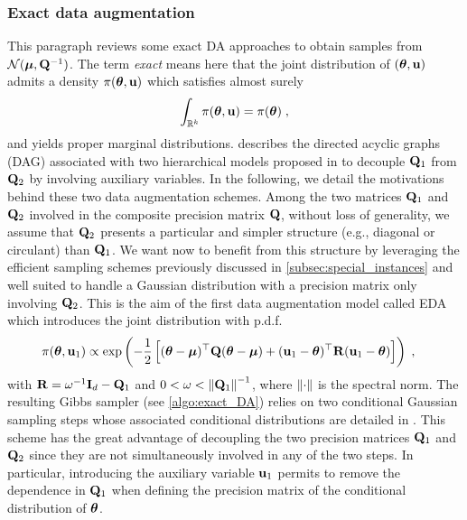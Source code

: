 \documentclass[nohypdvips,onefignum,onetabnum]{siamart171218}
\begin{document}
\subsubsection{Exact data augmentation} \label{subsec:data_aug_exact}
This paragraph reviews some exact DA approaches to obtain samples from $\mathcal{N}(\boldsymbol{\mu},\mathbf{Q}^{-1})$.
The term \textit{exact} means here that the joint distribution of $(\boldsymbol{\theta},\mathbf{u})$ admits a density $\pi(\boldsymbol{\theta},\mathbf{u})$ which satisfies almost surely
\begin{equation}
  \label{eq:exact_DA}
  \int_{\mathbb{R}^k} \pi(\Bs{\theta},\B{u}) = \pi(\Bs{\theta})\eqsp,
\end{equation}
and yields proper marginal distributions. 
 describes the directed acyclic graphs (DAG) associated with two hierarchical models proposed in \cite{Marnissi2018,Marnissi2019} to decouple $\mathbf{Q}_1$ from $\mathbf{Q}_2$ by involving auxiliary variables.  
In the following, we detail the motivations behind these two data augmentation schemes.
Among the two matrices $\mathbf{Q}_1$ and $\mathbf{Q}_2$ involved in the composite precision matrix $\mathbf{Q}$, without loss of generality, we assume that $\mathbf{Q}_2$ presents a particular and simpler structure (e.g., diagonal or circulant) than $\mathbf{Q}_1$. We want now to benefit from this structure by leveraging the efficient sampling schemes previously discussed in \cref{subsec:special_instances} and well suited to handle a Gaussian distribution with a precision matrix only involving $\mathbf{Q}_2$. This is the aim of the first data augmentation model called EDA which introduces the joint distribution with p.d.f.
\begin{align}
  \pi(\Bs{\theta},\B{u}_1) &\propto \exp\pr{-\dfrac{1}{2}\br{(\Bs{\theta}-\Bs{\mu})^{\top}\B{Q}(\Bs{\theta}-\Bs{\mu}) + (\B{u}_1-\Bs{\theta})^{\top}\B{R}(\B{u}_1-\Bs{\theta})}}\eqsp, \label{eq:EDA}
\end{align}
with $\mathbf{R} = \omega^{-1}\mathbf{I}_d - \mathbf{Q}_1$ and $0< \omega < \left\|\mathbf{Q}_1\right\|^{-1}$, where $\left\|\cdot\right\|$ is the spectral norm. The resulting Gibbs sampler (see \cref{algo:exact_DA}) relies on two conditional Gaussian sampling steps whose associated conditional distributions are detailed in  . This scheme has the great advantage of decoupling the two precision matrices $\mathbf{Q}_1$ and $\mathbf{Q}_2$ since they are not simultaneously involved in any of the two steps. In particular, introducing the auxiliary variable $\mathbf{u}_1$ permits to remove the dependence in $\mathbf{Q}_1$ when defining the precision matrix of the conditional distribution of $\boldsymbol{\theta}$.
\end{document}
